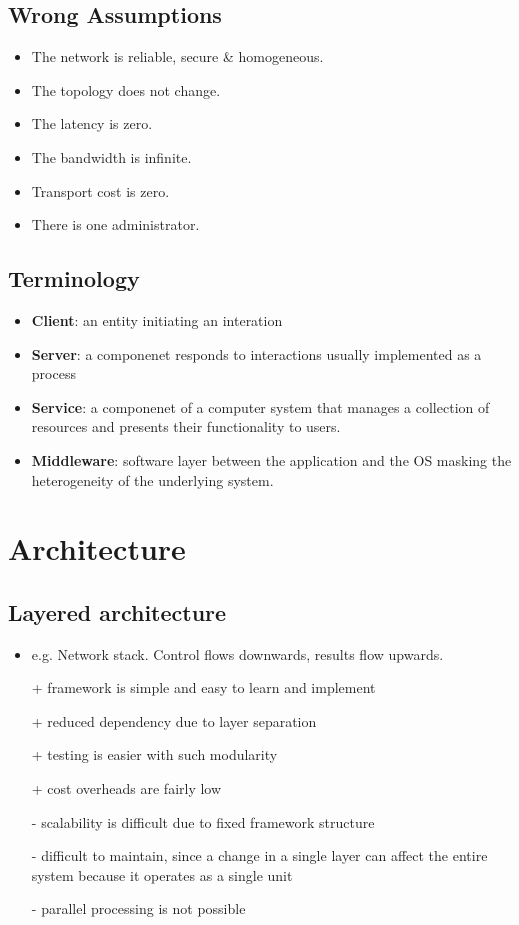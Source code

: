 \documentclass[twocolumn,landscape,10pt]{article}
\theoremstyle{definition}
\begin{document}
\subsection{Wrong Assumptions}

\begin{itemize}
    \item The network is reliable, secure \& homogeneous.
    \item The topology does not change.
    \item The latency is zero.
    \item The bandwidth is infinite.
    \item Transport cost is zero.
    \item There is one administrator.
\end{itemize} 

\subsection{Terminology}

\begin{itemize}
    \item \textbf{Client}: an entity initiating an interation
    \item \textbf{Server}: a componenet responds to interactions usually
        implemented as a process
    \item \textbf{Service}: a componenet of a computer system that manages a
        collection of resources and presents their functionality to users.
    \item \textbf{Middleware}: software layer between the application and the OS
        masking the heterogeneity of the underlying system.
\end{itemize} 


\section{Architecture}

\subsection{Layered architecture}
\begin{itemize}
    \item e.g. Network stack. Control flows downwards, results flow upwards.
    \item[+] framework is simple and easy to learn and implement
    \item[+] reduced dependency due to layer separation
    \item[+] testing is easier with such modularity
    \item[+] cost overheads are fairly low
    \item[-] scalability is difficult due to fixed framework structure
    \item[-] difficult to maintain, since a change in a single layer can
        affect the entire system because it operates as a single unit
    \item[-] parallel processing is not possible
\end{itemize} 
\end{document}

